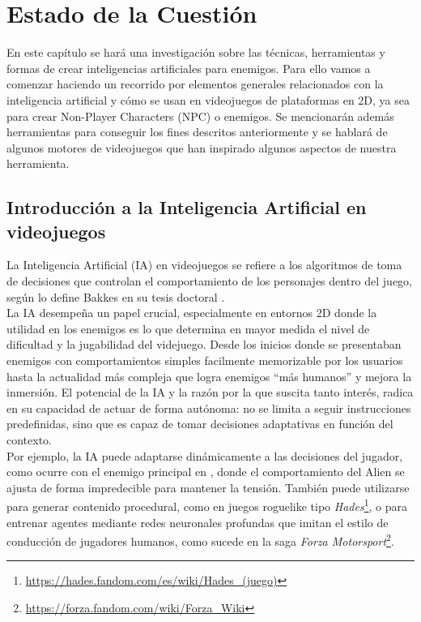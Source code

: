 \chapter{Estado de la Cuestión}
\label{cap:estadoDeLaCuestion}
En este capítulo se hará una investigación sobre las técnicas, herramientas y formas de crear inteligencias artificiales para enemigos.
Para ello vamos a comenzar haciendo un recorrido por elementos generales relacionados con la inteligencia artificial y cómo se usan en videojuegos de plataformas en 2D, ya sea para crear Non-Player Characters (NPC) o enemigos.
Se mencionarán además herramientas para conseguir los fines descritos anteriormente y se hablará de algunos motores de videojuegos que han inspirado algunos aspectos de nuestra herramienta. \\


\section{Introducción a la Inteligencia Artificial en videojuegos}

La Inteligencia Artificial (IA) en videojuegos se refiere a los algoritmos de toma de decisiones que controlan el comportamiento de los personajes dentro del juego, según lo define Bakkes en su tesis doctoral \cite{Bakkes2010}.\\

La IA desempeña un papel crucial, especialmente en entornos 2D donde la utilidad en los enemigos es lo que determina en mayor medida el nivel de dificultad y la jugabilidad del videjuego. Desde los inicios donde se  presentaban enemigos con comportamientos simples facilmente memorizable por los usuarios hasta la actualidad más compleja que logra enemigos “más humanos” y mejora la inmersión. El potencial de la IA y la razón por la que suscita tanto interés, radica en su capacidad de actuar de forma autónoma: no se limita a seguir instrucciones predefinidas, sino que es capaz de tomar decisiones adaptativas en función del contexto.\\

Por ejemplo, la IA puede adaptarse dinámicamente a las decisiones del jugador, como ocurre con el enemigo principal en  \cite{Hope2014}, donde el comportamiento del Alien se ajusta de forma impredecible para mantener la tensión. También puede utilizarse para generar contenido procedural, como en juegos roguelike tipo \textit{Hades}\footnote{\url{https://hades.fandom.com/es/wiki/Hades_(juego)}}, o para entrenar agentes mediante redes neuronales profundas que imitan el estilo de conducción de jugadores humanos, como sucede en la saga \textit{Forza Motorsport}\footnote{\url{https://forza.fandom.com/wiki/Forza_Wiki}}.\\

